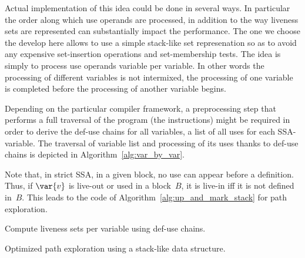 Actual implementation of this  idea could be done in several ways.
In particular the order along which use operands are processed, in addition to the way liveness sets are represented can substantially impact the performance.
The one we choose the develop here allows to use a simple stack-like set represenation so as to avoid any expensive set-insertion operations and set-membership tests.
The idea is simply to process use operands variable per variable.
In other words the processing of different variables is not intermixed, \ie the processing of one variable is completed before the processing of another variable begins.

Depending on the particular compiler framework, a preprocessing step that performs a full traversal of the program (\ie the instructions) might be required in order to derive the def-use chains for all variables, \ie a list of all uses for each SSA-variable.
The traversal of variable list and processing of its uses thanks to def-use chains is depicted in Algorithm~\ref{alg:var_by_var}.

Note that, in strict SSA, in a given block, no use can appear before a definition.
Thus, if $\var{v}$ is live-out or used in a block~$B$, it is live-in iff it is not defined in~$B$.
This leads to the code of Algorithm~\ref{alg:up_and_mark_stack} for path exploration.


\begin{algorithm}[H]
  \caption{Compute liveness sets per variable using def-use chains.}
  \label{alg:var_by_var}
\end{algorithm}




\begin{algorithm}[H]
  \caption{Optimized path exploration using a stack-like data structure.}
  \label{alg:up_and_mark_stack}
\end{algorithm}



